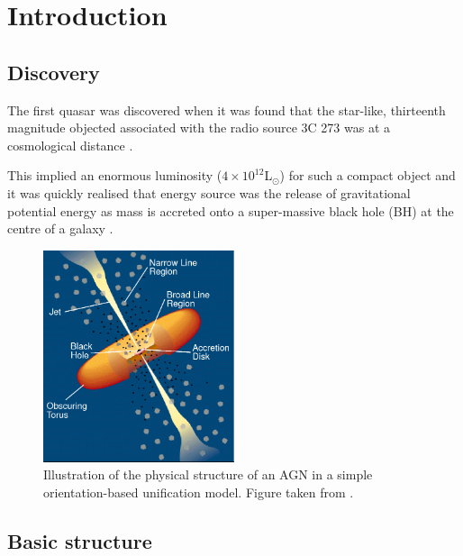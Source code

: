 
\chapter{Introduction}
\label{ch:intro}

\section{Discovery}

The first quasar was discovered when it was found that the star-like, thirteenth magnitude objected associated with the radio source 3C 273 was at a cosmological distance \citep[$z=0.158$;][]{schmidt63}. 



This implied an enormous luminosity ($4\times10^{12}$L$_\odot$) for such a compact object and it was quickly realised that energy source was the release of gravitational potential energy as mass is accreted onto a super-massive  black hole (BH) at the centre of a galaxy \citep[e.g.][]{hoyle63,salpeter64,lynden-bell69,lynden-bell71}. 

\begin{figure}
  \centering
  \includegraphics[width=0.5\textwidth]{figures/chapter05/urry_model}
  \caption[{Illustration of the physical structure of an AGN in a simple orientation-based unification model.}]{Illustration of the physical structure of an AGN in a simple orientation-based unification model. Figure taken from \citet{urry95}.}
  \label{fig:agnmodel}
\end{figure}

\section{Basic structure}

